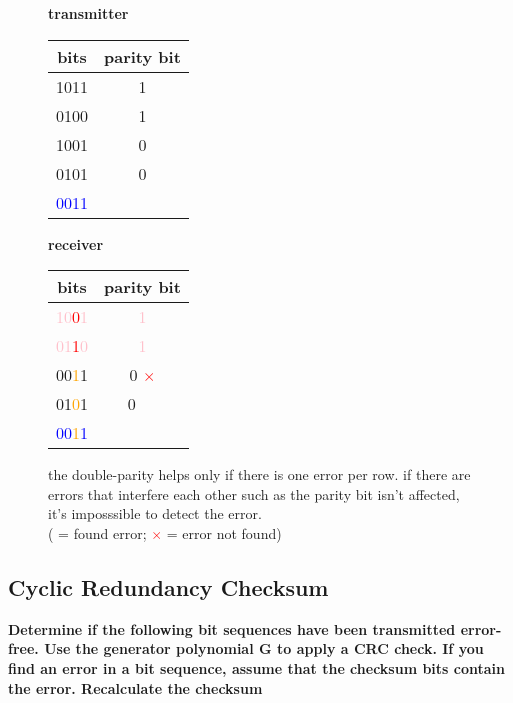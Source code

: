 \documentclass[a4paper,12pt]{article}
\begin{document}
	\begin{figure}[h!]
		\begin{minipage}{0.3\linewidth}
			\textbf{transmitter}\\
			\begin{tabular}{c|c}
				 bits & parity bit \\ \hline
				 1011 & 1 \\
				 0100 & 1 \\
				 1001 & 0 \\
				 0101 & 0 \\ \hline
				 \textcolor{blue}{0011} & \\ 
			\end{tabular}
		\end{minipage}
	\hfill
	\begin{minipage}{0.3\linewidth}
		\textbf{receiver}\\
		\begin{tabular}{c|c}
			bits & parity bit \\ \hline
			\textcolor{pink}{10\textcolor{red}{0}1} & \textcolor{pink}{1} \textcolor{green}{\checkmark} \\
			\textcolor{pink}{01\textcolor{red}{1}0} & \textcolor{pink}{1} \textcolor{green}{\checkmark} \\
			00\textcolor{orange}{1}1 & 0 \textcolor{red}{$\times$} \\
			01\textcolor{orange}{0}1 & 0 ~~ \\ \hline
			\textcolor{blue}{00\textcolor{orange}{1}1} & \\ 
		\end{tabular}
	\end{minipage}
	\hfill
	\begin{minipage}{0.36\linewidth}
		the double-parity helps only if there is one error per row. if there are errors that interfere each other such as the parity bit isn't affected, it's imposssible to detect the error.\\
		(\textcolor{green}{\checkmark} = found error; \textcolor{red}{$\times$} = error not found)
	\end{minipage}

	\end{figure}
	
	\subsection{Cyclic Redundancy Checksum}
	\textbf{Determine if the following bit sequences have been transmitted error-free.  Use the generator polynomial G	to apply a CRC check. If you find an error in a bit sequence,  assume that the checksum bits contain the error. Recalculate the checksum\\}
		
\end{document}
